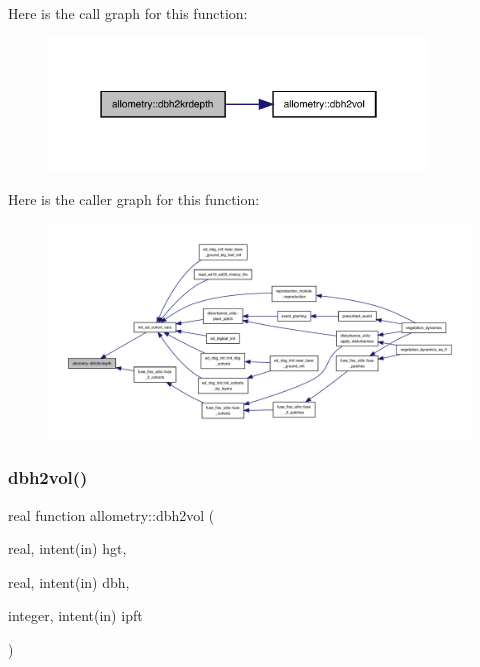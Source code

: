 Here is the call graph for this function\+:
\nopagebreak
\begin{figure}[H]
\begin{center}
\leavevmode
\includegraphics[width=286pt]{namespaceallometry_ac1523ea0e0ef8d2dd6a429f61a013c1c_cgraph}
\end{center}
\end{figure}
Here is the caller graph for this function\+:
\nopagebreak
\begin{figure}[H]
\begin{center}
\leavevmode
\includegraphics[width=350pt]{namespaceallometry_ac1523ea0e0ef8d2dd6a429f61a013c1c_icgraph}
\end{center}
\end{figure}
\mbox{\label{namespaceallometry_aab2b2cee61cac31529246b043121c7de}} 
\subsubsection{\texorpdfstring{dbh2vol()}{dbh2vol()}}
{\footnotesize\ttfamily real function allometry\+::dbh2vol (\begin{DoxyParamCaption}\item[{real, intent(in)}]{hgt,  }\item[{real, intent(in)}]{dbh,  }\item[{integer, intent(in)}]{ipft }\end{DoxyParamCaption})}

